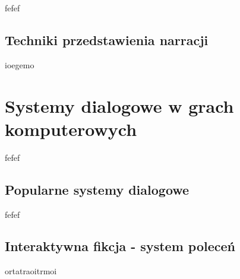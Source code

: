 fefef

\subsection{Techniki przedstawienia narracji}\label{subsection:ch1_2_3}

ioegemo

\section{Systemy dialogowe w grach komputerowych}\label{section:ch1_3}

fefef

\subsection{Popularne systemy dialogowe}\label{subsection:ch1_3_1}

fefef

\subsection{Interaktywna fikcja - system poleceń}\label{subsection:ch1_3_2}

ortatraoitrmoi